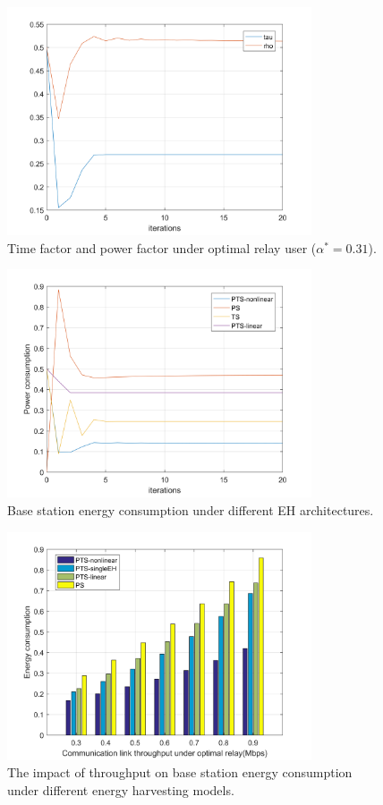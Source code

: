 \documentclass[conference]{IEEEtran}
\begin{document}
\begin{figure}[htbp]
\centerline{\includegraphics[width=9cm,keepaspectratio]{tau and rho.png}}
\caption{ Time factor and power factor under optimal relay user ($\alpha ^{\ast }=0.31$).}
\label{fig}
\end{figure}

\begin{figure}[htbp]
\centerline{\includegraphics[width=9cm,keepaspectratio]{PTS,PS,TS,PTS(linear).png}}
\caption{ Base station energy consumption under different EH architectures.}
\label{fig}
\end{figure}

\begin{figure}[htbp]
\centerline{\includegraphics[width=9cm,keepaspectratio]{throughput.png}}
\caption{ The impact of throughput on base station energy consumption under different energy harvesting models.}
\label{fig}
\end{figure}
\end{document}

